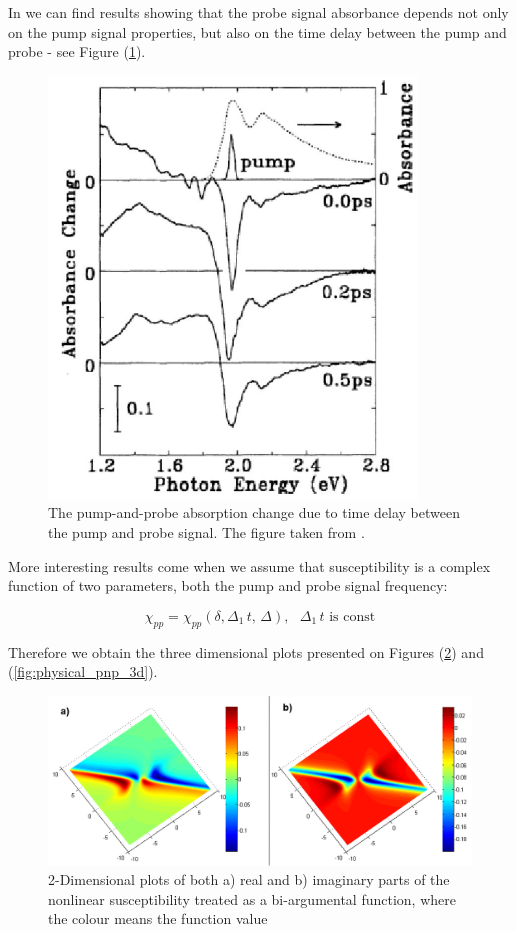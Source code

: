 \documentclass[12pt,twoside,a4paper]{article}
\numberwithin{equation}{subsection}
\numberwithin{figure}{subsection}
\begin{document}
In \cite{christodoulides_nonlinear} we can find results showing that the probe signal absorbance depends not only on the pump signal properties, but also on the time delay between the pump and probe - see Figure (\ref{physical_fig:pnp_absorption}).

\begin{figure} 
	\begin{center}
		\includegraphics{img/pnp_abs.png}
		\caption{The pump-and-probe absorption change due to time delay between the pump and probe signal. The figure taken from \cite{christodoulides_nonlinear}. \label{physical_fig:pnp_absorption} }
	\end{center}
\end{figure}


More interesting results come when we assume that susceptibility is a complex function of two parameters, both the pump and probe signal frequency:

\begin{equation} \label{eq:pnp_2args}
  \chi_{pp} = \chi_{pp}(\delta, \Delta_1 \, t , \,\Delta ), \ \ \ \Delta_1 \, t \text{ is const}
\end{equation}

Therefore we obtain the three dimensional plots presented on Figures (\ref{fig:physical_pnp_2d}) and (\ref{fig:physical_pnp_3d}).

\begin{figure}
  \includegraphics[width=150mm]{img/pnp_2d.png}
  \caption{2-Dimensional plots of both a) real and b) imaginary parts of the nonlinear susceptibility treated as a bi-argumental function, where the colour means the function value \label{fig:physical_pnp_2d}}
\end{figure}
\end{document}

